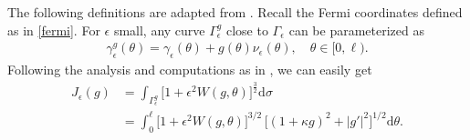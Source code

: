 \documentclass[10pt, reqno]{amsart}
\numberwithin{equation}{section}
\theoremstyle{definition}
\def\G{{\mathfrak G}}
\def\G{\Gamma}
\begin{document}
\smallskip
The following definitions are adapted from \cite{delPKowWei1}.
Recall the Fermi coordinates defined as in \eqref{fermi}. For $\epsilon$ small, any curve $\G^g_\epsilon$ close to $\G_\epsilon$ can be parameterized as
\begin{align*}
\gamma_\epsilon^g (\theta) = \gamma_\epsilon(\theta) + g (\theta) \nu_\epsilon (\theta), \quad \theta \in [0, \ell).
\end{align*}
Following the analysis and computations as in \cite{delPKowWei1}, we can easily get
\begin{align*}
J_\epsilon (g) & = \int_{\G_\epsilon^g} \big[1+ \epsilon^2 W (g, \theta) \big]^{\frac 32} {\mathrm d} \sigma
\\[2mm]
&= \int_0^{\ell} \Big[1+ \epsilon^2 W (g, \theta) \Big]^{3/2}\, \Big[ (1+\kappa g)^2 + |g'|^2\Big]^{1/2} {\mathrm d} \theta.
\end{align*}
\end{document}
